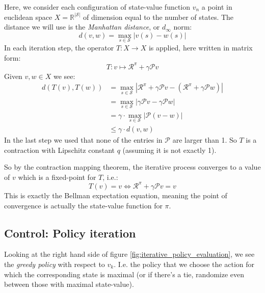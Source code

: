 \documentclass[12pt, a4paper]{article}
\numberwithin{equation}{section}
\begin{document}
Here, we consider each configuration of state-value function $v_n$ a point in euclidean space $X=\mathbb{R}^{|\mathcal{S}|}$ of dimension equal to the number of states. The distance we will use is the \textit{Manhattan distance}, or $d_\infty$ norm:
\begin{equation}
d(v,w)=\underset{s\in\mathcal{S}}{\max}|v(s)-w(s)|
\end{equation}
In each iteration step, the operator $T:X\rightarrow X$ is applied, here written in matrix form:
\begin{equation}
T: v\mapsto\mathcal{R}^\pi+\gamma\mathcal{P}v
\end{equation}
Given $v,w\in X$ we see:
\begin{align}
d(T(v),T(w))&=\underset{s\in\mathcal{S}}{\max}|\mathcal{R}^\pi+\gamma\mathcal{P}v-(\mathcal{R}^\pi+\gamma\mathcal{P}w)|\\
&=\underset{s\in\mathcal{S}}{\max}|\gamma\mathcal{P}v-\gamma\mathcal{P}w|\\
&=\gamma\cdot\underset{s\in\mathcal{S}}{\max}|\mathcal{P}(v-w)|\\
&\le\gamma\cdot d(v,w)
\end{align}
In the last step we used that none of the entries in $\mathcal{P}$ are larger than 1. So $T$ is a contraction with Lipschitz constant $q$ (assuming it is not exactly 1).

So by the contraction mapping theorem, the iterative process converges to a value of $v$ which is a fixed-point for $T$, i.e.:
\begin{equation}
T(v)=v\Leftrightarrow\mathcal{R}^\pi+\gamma\mathcal{P}v=v
\end{equation}
This is exactly the Bellman expectation equation, meaning the point of convergence is actually the state-value function for $\pi$.

\subsection{Control: Policy iteration}
Looking at the right hand side of figure \ref{fig:iterative_policy_evaluation}, we see the \textit{greedy policy} with respect to $v_k$. I.e. the policy that we choose the action for which the corresponding state is maximal (or if there's a tie, randomize even between those with maximal state-value).
\end{document}
